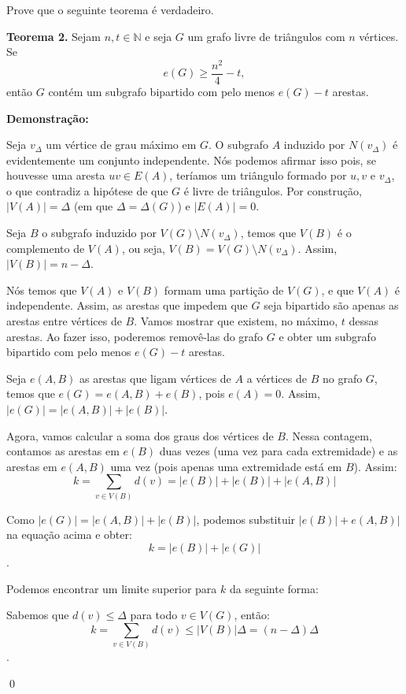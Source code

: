 \documentclass[12pt]{article}
\newenvironment{problem}[2][Exercício]{\begin{trivlist}
\item[\hskip \labelsep {\bfseries #1}\hskip \labelsep {\bfseries #2.}]}{\end{trivlist}}
\newenvironment{sol}
    {\textbf{Demonstração:}\emph{}
    }
    {
    \qed
    }
\begin{document}
\begin{problem}{5}
    Prove que o seguinte teorema é verdadeiro.
    
    \textbf{Teorema 2.} Sejam $n, t \in \mathbb{N}$ e seja $G$ um grafo livre de triângulos com $n$ vértices. Se
    \[
        e(G) \ge \frac{n^2}{4} - t,
    \]
    então $G$ contém um subgrafo bipartido com pelo menos $e(G) - t$ arestas.
\end{problem}
\begin{sol}
    Seja $v_\Delta$ um vértice de grau máximo em $G$.
    O subgrafo $A$ induzido por $N(v_\Delta)$ é evidentemente um conjunto independente.
    Nós podemos afirmar isso pois, se houvesse uma aresta $uv\in E(A)$, teríamos um triângulo
    formado por $u,v$ e $v_\Delta$, o que contradiz a hipótese de que $G$ é livre de triângulos.
    Por construção, $|V(A)|=\Delta$ (em que $\Delta=\Delta(G)$) e $|E(A)|=0$.

    Seja $B$ o subgrafo induzido por $V(G)\setminus N(v_\Delta)$,
    temos que $V(B)$ é o complemento de $V(A)$, ou seja, $V(B)=V(G)\setminus N(v_\Delta)$.
    Assim, $|V(B)|=n-\Delta$.

    Nós temos que $V(A)$ e $V(B)$ formam uma partição de $V(G)$,
    e que $V(A)$ é independente.
    Assim, as arestas que impedem que $G$ seja bipartido são apenas as arestas entre vértices de $B$.
    Vamos mostrar que existem, no máximo, $t$ dessas arestas.
    Ao fazer isso, poderemos removê-las do grafo $G$ e obter um subgrafo bipartido com pelo menos $e(G)-t$ arestas.
    
    Seja $e(A,B)$ as arestas que ligam vértices de $A$ a vértices de $B$ no grafo $G$,
    temos que $e(G)=e(A,B)+e(B)$, pois $e(A)=0$. Assim, $|e(G)|=|e(A,B)|+|e(B)|$.

    Agora, vamos calcular a soma dos graus dos vértices de $B$. Nessa contagem, contamos as
    arestas em $e(B)$ duas vezes (uma vez para cada extremidade) e as arestas em $e(A,B)$
    uma vez (pois apenas uma extremidade está em $B$). Assim:
    $$k=\sum_{v \in V(B)} d(v) = |e(B)| + |e(B)| + |e(A,B)|$$

    Como $|e(G)|=|e(A,B)|+|e(B)|$, podemos substituir $|e(B)|+e(A,B)|$ na equação acima e obter:
    $$k = |e(B)| + |e(G)|$$.

    Podemos encontrar um limite superior para $k$ da seguinte forma:

    Sabemos que $d(v)\leq \Delta$ para todo $v\in V(G)$, então:
    $$k=\sum_{v \in V(B)} d(v) \leq |V(B)|\Delta = (n-\Delta)\Delta$$.


\end{sol}
\end{document}
